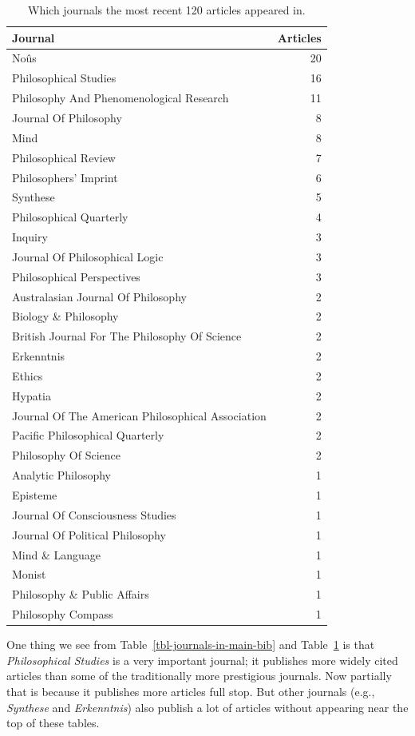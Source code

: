 \documentclass[
  10pt,
  letterpaper,
  DIV=11,
  numbers=noendperiod,
  twoside]{scrartcl}
\begin{document}
\begin{longtable}[]{@{}lr@{}}

\caption{\label{tbl-recent-journals-in-main-bib}Which journals the most
recent 120 articles appeared in.}

\tabularnewline

\toprule\noalign{}
Journal & Articles \\
\midrule\noalign{}
\endhead
\bottomrule\noalign{}
\endlastfoot
Noûs & 20 \\
Philosophical Studies & 16 \\
Philosophy And Phenomenological Research & 11 \\
Journal Of Philosophy & 8 \\
Mind & 8 \\
Philosophical Review & 7 \\
Philosophers' Imprint & 6 \\
Synthese & 5 \\
Philosophical Quarterly & 4 \\
Inquiry & 3 \\
Journal Of Philosophical Logic & 3 \\
Philosophical Perspectives & 3 \\
Australasian Journal Of Philosophy & 2 \\
Biology \& Philosophy & 2 \\
British Journal For The Philosophy Of Science & 2 \\
Erkenntnis & 2 \\
Ethics & 2 \\
Hypatia & 2 \\
Journal Of The American Philosophical Association & 2 \\
Pacific Philosophical Quarterly & 2 \\
Philosophy Of Science & 2 \\
Analytic Philosophy & 1 \\
Episteme & 1 \\
Journal Of Consciousness Studies & 1 \\
Journal Of Political Philosophy & 1 \\
Mind \& Language & 1 \\
Monist & 1 \\
Philosophy \& Public Affairs & 1 \\
Philosophy Compass & 1 \\

\end{longtable}

One thing we see from Table~\ref{tbl-journals-in-main-bib} and
Table~\ref{tbl-recent-journals-in-main-bib} is that \emph{Philosophical
Studies} is a very important journal; it publishes more widely cited
articles than some of the traditionally more prestigious journals. Now
partially that is because it publishes more articles full stop. But
other journals (e.g., \emph{Synthese} and \emph{Erkenntnis}) also
publish a lot of articles without appearing near the top of these
tables.
\end{document}

